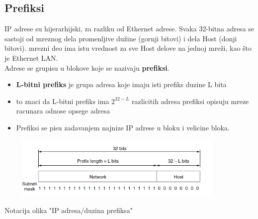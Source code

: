 \documentclass{article} %
\begin{document}
\subsection{Prefiksi}
IP adrese su hijerarhijski, za razliku od Ethernet adrese. Svaka 32-bitna adresa
se sastoji od mreznog dela promenljive dužine (gornji bitovi) i dela Host
(donji bitovi). mrezni deo ima istu vrednost za sve Host delove na jednoj
mreži, kao što je Ethernet LAN. \\

Adrese se grupisu u blokove koje se nazivaju \textbf{prefiksi}.
\begin{itemize}
  \item \textbf{L-bitni prefiks} je grupa adresa koje imaju isti prefiks duzine L bita
 \item to znaci da L-bitni prefiks ima $2^{32-L}$ razlicitih adresa
prefiksi opisuju mreze racunara odnose opsege adresa 
 \item Prefiksi se pisu zadavanjem najnize IP adrese u bloku i velicine bloka.
\end{itemize}
 \begin{center}
\includegraphics[width=12cm, height=3cm]{prefiks}\\
\end{center}
Notacija olika "IP adresa/duzina prefiksa"\\
\end{document}
